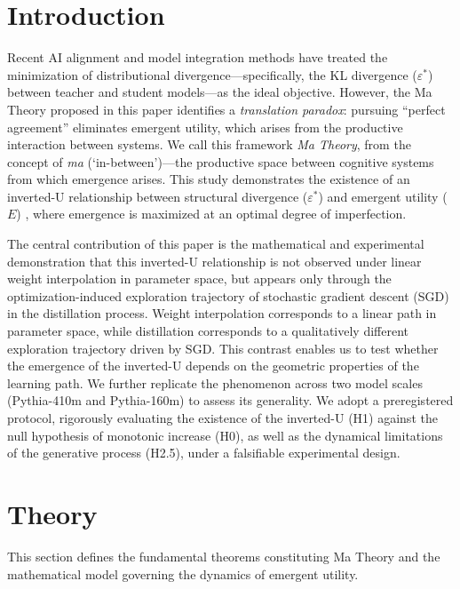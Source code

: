 \documentclass[11pt,a4paper]{article}
\begin{document}
\section{Introduction}

Recent AI alignment and model integration methods \cite{ouyang2022,christiano2017} have treated
the minimization of distributional divergence---specifically, the KL divergence
($\varepsilon^*$) between teacher and student models---as the ideal objective. However, the Ma
Theory proposed in this paper identifies a \emph{translation paradox}: pursuing ``perfect
agreement'' eliminates emergent utility, which arises from the productive interaction between
systems. We call this framework \emph{Ma Theory}, from the concept of \emph{ma}
(`in-between')---the productive space between cognitive systems from which emergence arises. This study demonstrates the existence of an inverted-U relationship between structural
divergence ($\varepsilon^*$) and emergent utility ($E$) \cite{page2007,wei2022}, where
emergence is maximized at an optimal degree of imperfection.

The central contribution of this paper is the mathematical and experimental demonstration that
this inverted-U relationship is not observed under linear weight interpolation in parameter
space, but appears only through the optimization-induced exploration trajectory of
stochastic gradient descent (SGD) in the distillation process. Weight interpolation corresponds
to a linear path in parameter space, while distillation corresponds to a qualitatively different
exploration trajectory driven by SGD. This contrast enables us to test whether the emergence of
the inverted-U depends on the geometric properties of the learning path. We further replicate
the phenomenon across two model scales (Pythia-410m and Pythia-160m) to assess its generality.
We adopt a preregistered protocol, rigorously evaluating the existence of the inverted-U (H1)
against the null hypothesis of monotonic increase (H0), as well as the dynamical limitations of
the generative process (H2.5), under a falsifiable experimental design.

\section{Theory}

This section defines the fundamental theorems constituting Ma Theory and the mathematical model
governing the dynamics of emergent utility.
\end{document}
